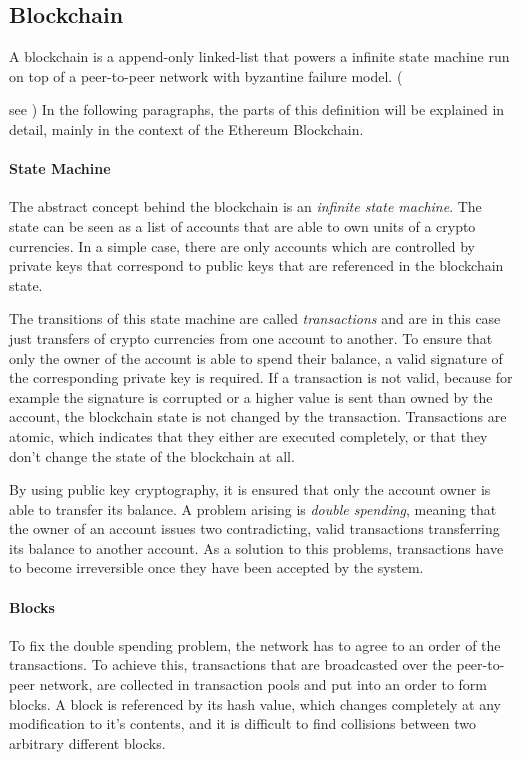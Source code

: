 \subsection{Blockchain}
A blockchain is a append-only linked-list that powers a infinite state machine run on top of a peer-to-peer network with byzantine failure model. ({see \cite{cryptroncis:blockchainesoftwareengineers}) In the following paragraphs, the parts of this definition will be explained in detail, mainly in the context of the Ethereum Blockchain.

\paragraph{State Machine}
The abstract concept behind the blockchain is an \textit{infinite state machine}. The state can be seen as a list of accounts that are able to own units of a crypto currencies. In a simple case, there are only accounts which are controlled by private keys that correspond to public keys that are referenced in the blockchain state.

The transitions of this state machine are called \textit{transactions} and are in this case just transfers of crypto currencies from one account to another. To ensure that only the owner of the account is able to spend their balance, a valid signature of the corresponding private key is required. If a transaction is not valid, because for example the signature is corrupted or a higher value is sent than owned by the account, the blockchain state is not changed by the transaction. Transactions are atomic, which indicates that they either are executed completely, or that they don't change the state of the blockchain at all.

By using public key cryptography, it is ensured that only the account owner is able to transfer its balance. A problem arising is \textit{double spending}, meaning that the owner of an account issues two contradicting, valid transactions transferring its balance to another account. As a solution to this problems, transactions have to become irreversible once they have been accepted by the system.

\paragraph{Blocks}
To fix the double spending problem, the network has to agree to an order of the transactions. To achieve this, transactions that are broadcasted over the peer-to-peer network, are collected in transaction pools and put into an order to form blocks. A block is referenced by its hash value, which changes completely at any modification to it's contents, and it is difficult to find collisions between two arbitrary different blocks.

}
